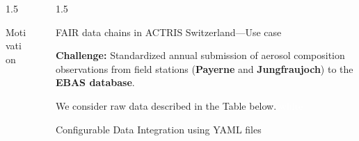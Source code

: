 \documentclass[final]{beamer}
\newlength{\sepwidth}
\newlength{\colwidth}
\newcommand{\separatorcolumn}{\begin{column}{\sepwidth}\end{column}}
\begin{document}
\begin{frame}[t]
\begin{columns}[t]
\begin{column}{1.5\colwidth}
\begin{block}{Motivation}
\end{block}

\end{column}



\separatorcolumn

\begin{column}{1.5\colwidth}

\begin{block}{FAIR data chains in ACTRIS Switzerland---Use case}


\textbf{Challenge: }Standardized annual submission of  aerosol composition observations from field stations (\textbf{Payerne} and \textbf{Jungfraujoch}) to the \textbf{EBAS database}.

\textcolor{white}{ }
We consider raw data described in the Table below.
\textcolor{white}{white}
\begin{table}[!ht]
\end{table}

  \end{block}
\begin{block}{Configurable Data Integration using YAML files}
     

\end{block}
\end{column}
\end{columns}
\end{frame}
\end{document}
